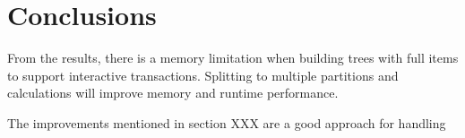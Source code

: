 \section{Conclusions}
From the results, there is a memory limitation when building trees with full items to support interactive transactions. Splitting to multiple partitions and calculations will improve memory and runtime performance.

The improvements mentioned in section XXX are a good approach for handling 

